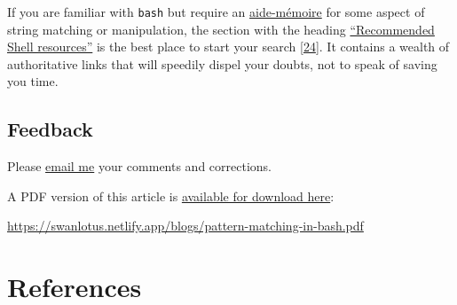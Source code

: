 \documentclass[
  a4paper,
]{article}
\begin{document}
If you are familiar with \texttt{bash} but require an
\href{https://www.thefreedictionary.com/aide+memoire}{aide-mémoire} for
some aspect of string matching or manipulation, the section with the
heading
\href{https://wiki.bash-hackers.org/start\#recommended_shell_resources}{``Recommended
Shell resources''} is the best place to start your search
{[}\protect\hyperlink{ref-bhwstart}{24}{]}. It contains a wealth of
authoritative links that will speedily dispel your doubts, not to speak
of saving you time.

\hypertarget{feedback}{%
\subsection{Feedback}\label{feedback}}

Please \href{mailto:feedback.swanlotus@gmail.com}{email me} your
comments and corrections.

\noindent A PDF version of this article is
\href{./pattern-matching-in-bash.pdf}{available for download here}:

\begin{small}

\begin{sffamily}

\url{https://swanlotus.netlify.app/blogs/pattern-matching-in-bash.pdf}

\end{sffamily}

\end{small}

\hypertarget{bibliography}{%
\section*{References}\label{bibliography}}
\end{document}
